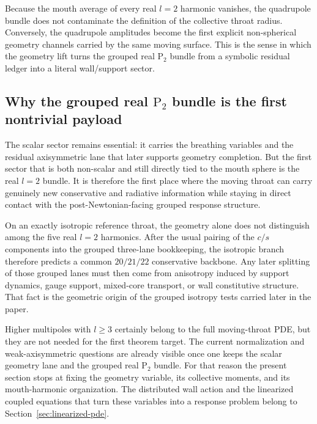 \documentclass[11pt]{article}
\theoremstyle{definition}
\newcommand{\Ptwo}{\ensuremath{\mathrm{P}_2}}
\begin{document}
Because the mouth average of every real $l=2$ harmonic vanishes, the quadrupole bundle does not contaminate the definition of the collective throat radius. Conversely, the quadrupole amplitudes become the first explicit non-spherical geometry channels carried by the same moving surface. This is the sense in which the geometry lift turns the grouped real $\Ptwo$ bundle from a symbolic residual ledger into a literal wall/support sector.

\subsection{Why the grouped real \texorpdfstring{$\Ptwo$}{Ptwo} bundle is the first nontrivial payload}

The scalar sector remains essential: it carries the breathing variables and the residual axisymmetric lane that later supports geometry completion. But the first sector that is both non-scalar and still directly tied to the mouth sphere is the real $l=2$ bundle. It is therefore the first place where the moving throat can carry genuinely new conservative and radiative information while staying in direct contact with the post-Newtonian-facing grouped response structure.

On an exactly isotropic reference throat, the geometry alone does not distinguish among the five real $l=2$ harmonics. After the usual pairing of the $c/s$ components into the grouped three-lane bookkeeping, the isotropic branch therefore predicts a common $20/21/22$ conservative backbone. Any later splitting of those grouped lanes must then come from anisotropy induced by support dynamics, gauge support, mixed-core transport, or wall constitutive structure. That fact is the geometric origin of the grouped isotropy tests carried later in the paper.

Higher multipoles with $l\geq 3$ certainly belong to the full moving-throat PDE, but they are not needed for the first theorem target. The current normalization and weak-axisymmetric questions are already visible once one keeps the scalar geometry lane and the grouped real $\Ptwo$ bundle. For that reason the present section stops at fixing the geometry variable, its collective moments, and its mouth-harmonic organization. The distributed wall action and the linearized coupled equations that turn these variables into a response problem belong to Section~\ref{sec:linearized-pde}.

\end{document}

